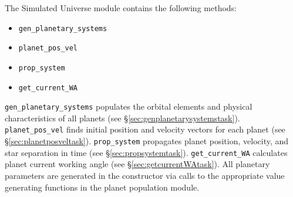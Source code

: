 \documentclass[cleanfoot]{asme2ej}
\begin{document}
The Simulated Universe module contains the following methods: 
\begin{itemize}
\item[] \verb+gen_planetary_systems+
\item[] \verb+planet_pos_vel+
\item[] \verb+prop_system+
\item[] \verb+get_current_WA+
\end{itemize}

\verb+gen_planetary_systems+ populates the orbital elements and physical characteristics of all planets (see \S\ref{sec:genplanetarysystemstask}). 
\verb+planet_pos_vel+ finds initial position and velocity vectors for each planet (see \S\ref{sec:planetposveltask}).
\verb+prop_system+ propagates planet position,  velocity, and star separation in time (see \S\ref{sec:propsystemtask}).
\verb+get_current_WA+ calculates planet current working angle (see \S\ref{sec:getcurrentWAtask}).
All planetary parameters are generated in the constructor via calls to the appropriate value generating functions in the planet population module.

\end{document}
